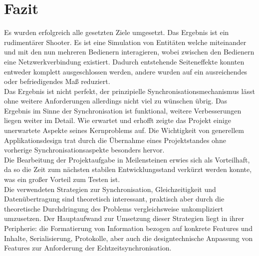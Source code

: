 \section{Fazit}
Es wurden erfolgreich alle gesetzten Ziele umgesetzt. Das Ergebnis ist ein rudimentärer Shooter. Es ist eine Simulation von Entitäten welche miteinander und mit den nun mehreren Bedienern interagieren, wobei zwischen den Bedienern eine Netzwerkverbindung existiert. Dadurch entstehende Seiteneffekte konnten entweder  komplett ausgeschlossen werden, andere wurden auf ein ausreichendes oder befriedigendes Maß reduziert.\\
Das Ergebnis ist nicht perfekt, der prinzipielle Synchronisationsmechanismus lässt ohne weitere Anforderungen allerdings nicht viel zu wünschen übrig. Das Ergebnis im Sinne der Synchronisation ist funktional, weitere Verbesserungen liegen weiter im Detail.
Wie erwartet und erhofft zeigte das Projekt einige unerwartete Aspekte seines Kernproblems auf. 
Die Wichtigkeit von generellem Applikationsdesign trat durch die Übernahme eines Projektstandes ohne vorherige Synchronisationsaspekte besonders hervor.\\
Die Bearbeitung der Projektaufgabe in Meilensteinen erwies sich als Vorteilhaft, da so die Zeit zum nächsten stabilen Entwicklungsstand verkürzt werden konnte, was ein großer Vorteil zum Testen ist.\\
Die verwendeten Strategien zur Synchronisation, Gleichzeitigkeit und Datenübertragung sind theoretisch interessant, praktisch aber durch die theoretische Durchdringung des Problems vergleichsweise unkompliziert umzusetzen. Der Hauptaufwand zur Umsetzung dieser Strategien liegt in ihrer Peripherie: die Formatierung von Information bezogen auf konkrete Features und Inhalte, Serialisierung, Protokolle, aber auch die designtechnische Anpassung von Features zur Anforderung der Echtzeitsynchronisation. 